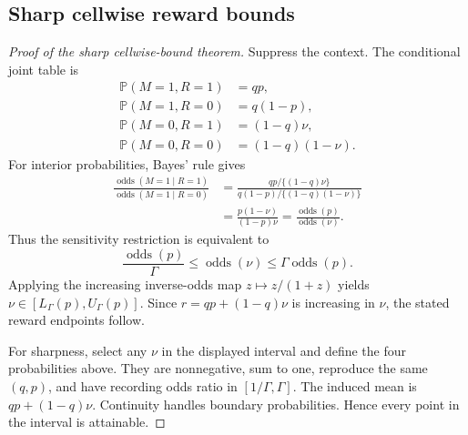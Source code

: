 \documentclass[letterpaper]{article}
\newcommand{\Prb}{\mathbb{P}}
\newcommand{\odds}{\operatorname{odds}}
\begin{document}
\subsection{Sharp cellwise reward bounds}
\begin{proof}[Proof of the sharp cellwise-bound theorem]
Suppress the context. The conditional joint table is
\begin{align*}
\Prb(M=1,R=1)&=qp,\\
\Prb(M=1,R=0)&=q(1-p),\\
\Prb(M=0,R=1)&=(1-q)\nu,\\
\Prb(M=0,R=0)&=(1-q)(1-\nu).
\end{align*}
For interior probabilities, Bayes' rule gives
\begin{align*}
\frac{\odds(M=1\mid R=1)}{\odds(M=1\mid R=0)}
&=\frac{qp/\{(1-q)\nu\}}{q(1-p)/\{(1-q)(1-\nu)\}}\\
&=\frac{p(1-\nu)}{(1-p)\nu}
=\frac{\odds(p)}{\odds(\nu)}.
\end{align*}
Thus the sensitivity restriction is equivalent to
\[
\frac{\odds(p)}{\Gamma}\leq\odds(\nu)\leq\Gamma\odds(p).
\]
Applying the increasing inverse-odds map $z\mapsto z/(1+z)$ yields
$\nu\in[L_\Gamma(p),U_\Gamma(p)]$. Since
$r=qp+(1-q)\nu$ is increasing in $\nu$, the stated reward endpoints follow.

For sharpness, select any $\nu$ in the displayed interval and define the four probabilities above. They are nonnegative, sum to one, reproduce the same $(q,p)$, and have recording odds ratio in $[1/\Gamma,\Gamma]$. The induced mean is $qp+(1-q)\nu$. Continuity handles boundary probabilities. Hence every point in the interval is attainable.
\end{proof}
\end{document}
